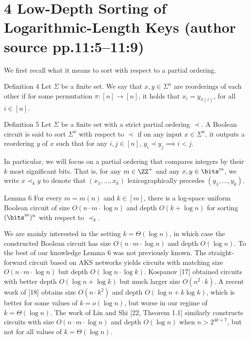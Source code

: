 \section*{4 Low-Depth Sorting of Logarithmic-Length Keys (author source pp.11:5--11:9)}
We first recall what it means to sort with respect to a partial ordering.
\begin{originalresult}{Definition 4}
Let $\Sigma$ be a finite set. We say that $x,y\in\Sigma^n$ are reorderings of each other if for some permutation $\pi:[n]\to[n]$, it holds that $x_i=y_{\pi(i)}$, for all $i\in[n]$.
\end{originalresult}
\begin{originalresult}{Definition 5}
Let $\Sigma$ be a finite set with a strict partial ordering $\prec$. A Boolean circuit is said to sort $\Sigma^n$ with respect to $\prec$ if on any input $x\in\Sigma^n$, it outputs a reordering $y$ of $x$ such that for any $i,j\in[n]$, $y_i\prec y_j\implies i<j$.
\end{originalresult}
In particular, we will focus on a partial ordering that compares integers by their $k$ most significant bits. That is, for any $m\in\ZZ^+$ and any $x,y\in\bits^m$, we write $x\prec_k y$ to denote that $(x_1,\ldots,x_k)$ lexicographically precedes $(y_1,\ldots,y_k)$.
\begin{originalresult}{Lemma 6}
For every $m=m(n)$ and $k\in[m]$, there is a log-space uniform Boolean circuit of size $O(n\cdot m\cdot\log n)$ and depth $O(k+\log n)$ for sorting $(\bits^m)^n$ with respect to $\prec_k$.
\end{originalresult}
We are mainly interested in the setting $k=\Theta(\log n)$, in which case the constructed Boolean circuit has size $O(n\cdot m\cdot\log n)$ and depth $O(\log n)$.
To the best of our knowledge Lemma 6 was not previously known. The straight-forward circuit based on AKS networks yields circuits with matching size $O(n\cdot m\cdot\log n)$ but depth $O(\log n\cdot\log k)$. Kospanov [17] obtained circuits with better depth $O(\log n+\log k)$ but much larger size $O(n^2\cdot k)$. A recent work of [18] obtains size $O(n\cdot k^2)$ and depth $O(\log n+k\log k)$, which is better for some values of $k=o(\log n)$, but worse in our regime of $k=\Theta(\log n)$. The work of Lin and Shi [22, Theorem 1.1] similarly constructs circuits with size $O(n\cdot m\cdot\log n)$ and depth $O(\log n)$ when $n>2^{4k+7}$, but not for all values of $k=\Theta(\log n)$.
